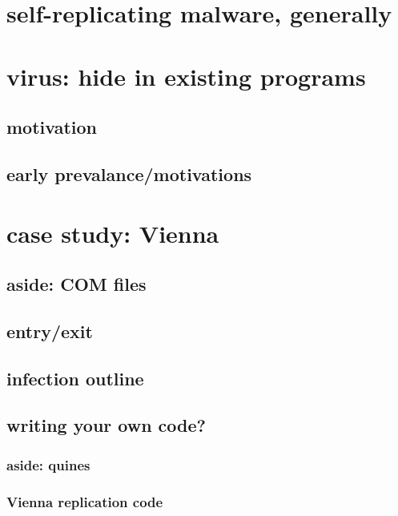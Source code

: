 

\section{self-replicating malware, generally}




\section{virus: hide in existing programs}

\subsection{motivation}


\subsection{early prevalance/motivations}


\section{case study: Vienna}



\subsection{aside: COM files}



\subsection{entry/exit}



\subsection{infection outline}



\subsection{writing your own code?}

\subsubsection{aside: quines}




\subsubsection{Vienna replication code}





